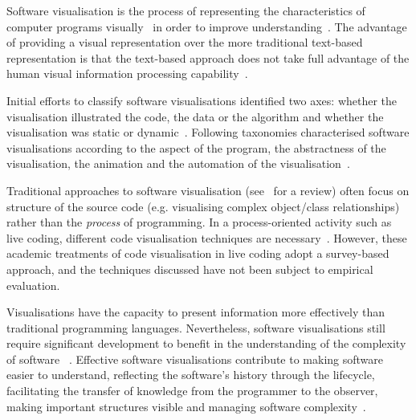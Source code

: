 Software visualisation is the process of representing the characteristics of computer programs visually~\cite{Stasko1992} in order to improve understanding~\cite{Diehl2007}. The advantage of providing a visual representation over the more traditional text-based representation is that the text-based approach does not take full advantage of the human visual information processing capability~\cite{Myers1989}.

Initial efforts to classify software visualisations identified two axes: whether the visualisation illustrated the code, the data or the algorithm and whether the visualisation was static or dynamic~\cite{Myers1989}. Following taxonomies characterised software visualisations according to the aspect of the program, the abstractness of the visualisation, the animation and the automation of the visualisation~\cite{Stasko1992}.

Traditional approaches to software visualisation (see~\cite{Novais2013} for a review) often focus on structure of the source code (e.g. visualising complex object/class relationships) rather than the \emph{process} of programming. In a process-oriented activity such as live coding, different code visualisation techniques are necessary~\cite{McLean2010b,Magnusson2013}. However, these academic treatments of code visualisation in live coding adopt a survey-based approach, and the techniques discussed have not been subject to empirical evaluation.

Visualisations have the capacity to present information more effectively than traditional programming languages. Nevertheless, software visualisations still require significant development to benefit in the understanding of the complexity of software ~\cite{Baecker1995}. Effective software visualisations contribute to making software easier to understand, reflecting the software's history through the lifecycle, facilitating the transfer of knowledge from the programmer to the observer, making important structures visible and managing software complexity~\cite{Baecker1995}.



